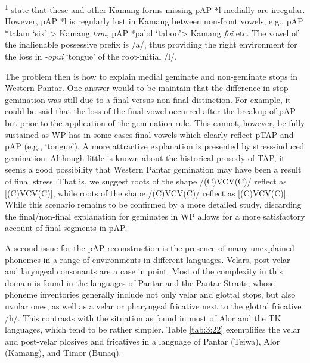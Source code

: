 \begin{sidewaystable}
\textsuperscript{1} \citet{HoltonEtAl2012} state that these and other Kamang forms missing pAP *l medially are irregular. However, pAP *l is regularly lost in Kamang between non-front vowels, e.g., pAP *talam `six' {\textgreater} Kamang \textit{ta{\textlengthmark}m}, pAP *palol `taboo'{\textgreater} Kamang \textit{fo{\textlengthmark}i} etc. The vowel of the inalienable possessive prefix is /a/, thus providing the right environment for the loss in \textit{{}-opui} `tongue' of the root-initial /l/.  
\end{sidewaystable}


The problem then is how to explain medial geminate and non-geminate stops in Western Pantar. One answer would to be maintain that the difference in stop gemination was still due to a final versus non-final distinction. For example, it could be said that the loss of the final vowel occurred after the breakup of pAP but prior to the application of the gemination rule. This cannot, however, be fully sustained as WP has in some cases final vowels which clearly reflect pTAP and pAP (e.g., `tongue'). A more attractive explanation is presented by stress-induced gemination. Although little is known about the historical prosody of TAP, it seems a good possibility that Western Pantar gemination may have been a result of final stress. That is, we suggest roots of the shape /(C)V{\textprimstress}CV(C)/ reflect as [(C)V{\textprimstress}C{\textlengthmark}V(C)], while roots of the shape /{\textprimstress}(C)VCV(C)/ reflect as [{\textprimstress}(C)VCV(C)]. While this scenario remains to be confirmed by a more detailed study, discarding the final/non-final explanation for geminates in WP allows for a more satisfactory account of final segments in pAP.

A second issue for the pAP reconstruction is the presence of many unexplained phonemes in a range of environments in different languages. Velars, post-velar and laryngeal consonants are a case in point. Most of the complexity in this domain is found in the languages of Pantar and the Pantar Straits, whose phoneme inventories generally include not only velar and glottal stops, but also uvular ones, as well as a velar or pharyngeal fricative next to the glottal fricative /h/. This contrasts with the situation as found in most of Alor and the TK languages, which tend to be rather simpler. Table \ref{tab:3:22} exemplifies the velar and post-velar plosives and fricatives in a language of Pantar (Teiwa), Alor (Kamang), and Timor (Bunaq).



